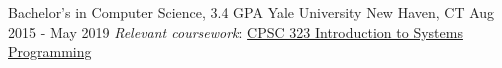 

\begin{cventries}

  \cventry
    {Bachelor's in Computer Science, 3.4 GPA} %
    {Yale University} %
    {New Haven, CT} %
    {Aug 2015 - May 2019} %
    {\textit{Relevant coursework}: \href{https://zoo.cs.yale.edu/classes/cs323/}{CPSC 323 Introduction to Systems Programming}}

\end{cventries}
